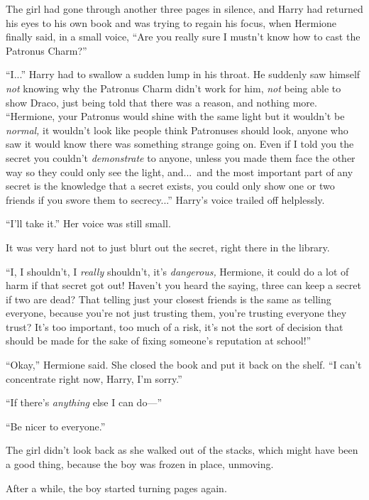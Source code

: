 The girl had gone through another three pages in silence, and Harry had returned his eyes to his own book and was trying to regain his focus, when Hermione finally said, in a small voice, “Are you really sure I mustn’t know how to cast the Patronus Charm?”

“I...” Harry had to swallow a sudden lump in his throat. He suddenly saw himself \emph{not} knowing why the Patronus Charm didn’t work for him, \emph{not} being able to show Draco, just being told that there was a reason, and nothing more. “Hermione, your Patronus would shine with the same light but it wouldn’t be \emph{normal,} it wouldn’t look like people think Patronuses should look, anyone who saw it would know there was something strange going on. Even if I told you the secret you couldn’t \emph{demonstrate} to anyone, unless you made them face the other way so they could only see the light, and...\ and the most important part of any secret is the knowledge that a secret exists, you could only show one or two friends if you swore them to secrecy...” Harry’s voice trailed off helplessly.

“I’ll take it.” Her voice was still small.

It was very hard not to just blurt out the secret, right there in the library.

“I, I shouldn’t, I \emph{really} shouldn’t, it’s \emph{dangerous,} Hermione, it could do a lot of harm if that secret got out! Haven’t you heard the saying, three can keep a secret if two are dead? That telling just your closest friends is the same as telling everyone, because you’re not just trusting them, you’re trusting everyone they trust? It’s too important, too much of a risk, it’s not the sort of decision that should be made for the sake of fixing someone’s reputation at school!”

“Okay,” Hermione said. She closed the book and put it back on the shelf. “I can’t concentrate right now, Harry, I’m sorry.”

“If there’s \emph{anything} else I can do—”

“Be nicer to everyone.”

The girl didn’t look back as she walked out of the stacks, which might have been a good thing, because the boy was frozen in place, unmoving.

After a while, the boy started turning pages again.

